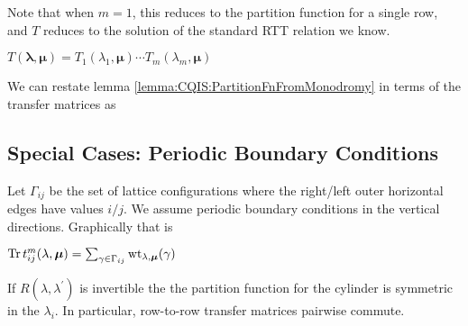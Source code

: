 \documentclass{article}
\begin{document}
\begin{remark}
Note that when $m=1$, this reduces to the partition function for a single row, and $T$ reduces to the solution of the standard RTT relation we know. 
\end{remark}

\begin{lemma}
$T(\bm{\lambda},\bm{\mu}) = T_1(\lambda_1,\bm{\mu}) \cdots T_m(\lambda_m,\bm{\mu})$
\end{lemma}

\begin{lemma}
We can restate lemma \ref{lemma:CQIS:PartitionFnFromMonodromy} in terms of the transfer matrices as 
\end{lemma}

\subsection{Special Cases: Periodic Boundary Conditions}
Let $\Gamma_{ij}$ be the set of lattice configurations where the right/left outer horizontal edges have values $i/j$. We assume periodic boundary conditions in the vertical directions. Graphically that is 
\begin{center}
\end{center}

\begin{lemma}
$\operatorname{Tr} t_{ij}^m(\lambda,\bm{\mu}) = \sum_{\gamma \in \Gamma_{ij}} \operatorname{wt}_{\lambda,\bm{\mu}}(\gamma)$
\end{lemma}

\begin{lemma}
If $R(\lambda,\lambda^\prime)$ is invertible the the partition function for the cylinder 
is symmetric in the $\lambda_i$. In particular, row-to-row transfer matrices 
pairwise commute. 
\end{lemma}
\end{document}
